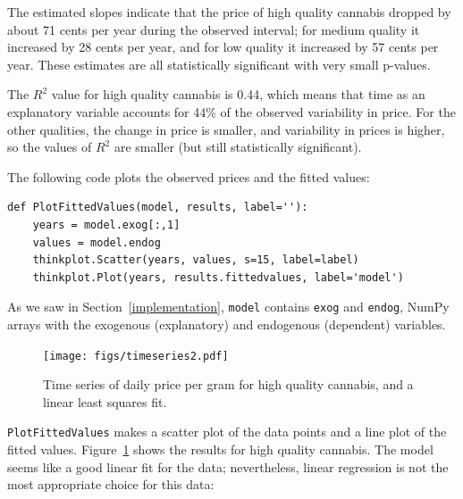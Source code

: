 \documentclass[12pt]{book}
\theoremstyle{exercise}
\begin{document}
The estimated slopes indicate that the price of high quality cannabis
dropped by about 71 cents per year during the observed interval; for
medium quality it increased by 28 cents per year, and for low quality
it increased by 57 cents per year.  These estimates are all
statistically significant with very small p-values.%
%
%

The $R^2$ value for high quality cannabis is 0.44, which means
that time as an explanatory variable accounts for 44\% of the observed
variability in price.  For the other qualities, the change in price
is smaller, and variability in prices is higher, so the values
of $R^2$ are smaller (but still statistically significant).%
%
%

The following code plots the observed prices and the fitted values:

\begin{verbatim}
def PlotFittedValues(model, results, label=''):
    years = model.exog[:,1]
    values = model.endog
    thinkplot.Scatter(years, values, s=15, label=label)
    thinkplot.Plot(years, results.fittedvalues, label='model')
\end{verbatim}

As we saw in Section~\ref{implementation}, {\tt model} contains
{\tt exog} and {\tt endog}, NumPy arrays with the exogenous
(explanatory) and endogenous (dependent) variables.%
%
%
%
%

\begin{figure}
\centerline{\texttt{[image: figs/timeseries2.pdf]}}
\caption{Time series of daily price per gram for high quality cannabis,
and a linear least squares fit.}%
\label{timeseries2}
\end{figure}

{\tt PlotFittedValues} makes a scatter plot of the data points and a line
plot of the fitted values.  Figure~\ref{timeseries2} shows the results
for high quality cannabis.  The model seems like a good linear fit
for the data; nevertheless, linear regression is not the most
appropriate choice for this data:%
%
\end{document}
